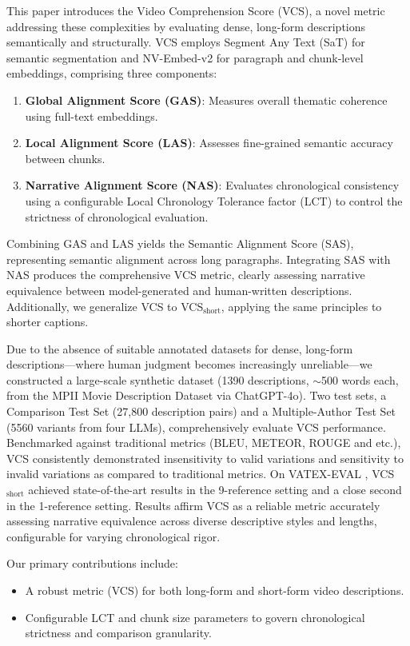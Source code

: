 \documentclass[letterpaper]{article} %
\begin{document}
This paper introduces the Video Comprehension Score (VCS), a novel metric addressing these complexities by evaluating dense, long-form descriptions semantically and structurally. VCS employs Segment Any Text (SaT) \citep{frohmann-etal-2024-segment} for semantic segmentation and NV-Embed-v2 \citep{l:24} for paragraph and chunk-level embeddings, comprising three components:
\begin{enumerate}
\item \textbf{Global Alignment Score (GAS)}: Measures overall thematic coherence using full-text embeddings.
\item \textbf{Local Alignment Score (LAS)}: Assesses fine-grained semantic accuracy between chunks.
\item \textbf{Narrative Alignment Score (NAS)}: Evaluates chronological consistency using a configurable Local Chronology Tolerance factor (LCT) to control the strictness of chronological evaluation.
\end{enumerate}

Combining GAS and LAS yields the Semantic Alignment Score (SAS), representing semantic alignment across long paragraphs. Integrating SAS with NAS produces the comprehensive VCS metric, clearly assessing narrative equivalence between model-generated and human-written descriptions. Additionally, we generalize VCS to VCS$_{\text{short}}$, applying the same principles to shorter captions.

Due to the absence of suitable annotated datasets for dense, long-form descriptions—where human judgment becomes increasingly unreliable—we constructed a large-scale synthetic dataset (1390 descriptions, $\sim$500 words each, from the MPII Movie Description Dataset \citep{rohrbach2015dataset} via ChatGPT-4o). Two test sets, a Comparison Test Set (27,800 description pairs) and a Multiple-Author Test Set (5560 variants from four LLMs), comprehensively evaluate VCS performance. Benchmarked against traditional metrics (BLEU, METEOR, ROUGE and etc.), VCS consistently demonstrated insensitivity to valid variations and sensitivity to invalid variations as compared to traditional metrics. On VATEX-EVAL \citep{syxl:22}, VCS$_{\text{short}}$ achieved state-of-the-art results in the 9-reference setting and a close second in the 1-reference setting. Results affirm VCS as a reliable metric accurately assessing narrative equivalence across diverse descriptive styles and lengths, configurable for varying chronological rigor.

Our primary contributions include:
\begin{itemize}
\item A robust metric (VCS) for both long-form and short-form video descriptions.
\item Configurable LCT and chunk size parameters to govern chronological strictness and comparison granularity.
\end{itemize}
\end{document}
